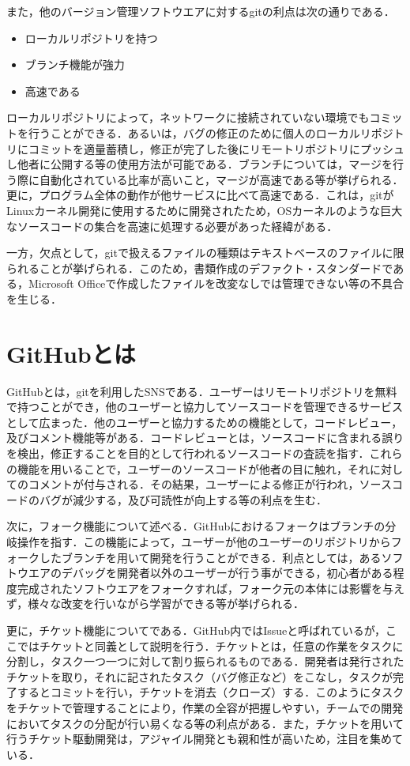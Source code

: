 \documentclass[a4paper,9pt,twocolumn]{jsarticle}
\begin{document}
また，他のバージョン管理ソフトウエアに対するgitの利点は次の通りである．

\begin{itemize}
\item ローカルリポジトリを持つ
\item ブランチ機能が強力
\item 高速である
\end{itemize}

ローカルリポジトリによって，ネットワークに接続されていない環境でもコミットを行うことができる．あるいは，バグの修正のために個人のローカルリポジトリにコミットを適量蓄積し，修正が完了した後にリモートリポジトリにプッシュし他者に公開する等の使用方法が可能である．ブランチについては，マージを行う際に自動化されている比率が高いこと，マージが高速である等が挙げられる．更に，プログラム全体の動作が他サービスに比べて高速である．これは，gitがLinuxカーネル開発に使用するために開発されたため，OSカーネルのような巨大なソースコードの集合を高速に処理する必要があった経緯がある．

一方，欠点として，gitで扱えるファイルの種類はテキストベースのファイルに限られることが挙げられる．このため，書類作成のデファクト・スタンダードである，Microsoft Officeで作成したファイルを改変なしでは管理できない等の不具合を生じる．

\section{GitHubとは}
GitHubとは，gitを利用したSNSである．ユーザーはリモートリポジトリを無料で持つことができ，他のユーザーと協力してソースコードを管理できるサービスとして広まった．他のユーザーと協力するための機能として，コードレビュー，及びコメント機能等がある．コードレビューとは，ソースコードに含まれる誤りを検出，修正することを目的として行われるソースコードの査読を指す．これらの機能を用いることで，ユーザーのソースコードが他者の目に触れ，それに対してのコメントが付与される．その結果，ユーザーによる修正が行われ，ソースコードのバグが減少する，及び可読性が向上する等の利点を生む．

次に，フォーク機能について述べる．GitHubにおけるフォークはブランチの分岐操作を指す．この機能によって，ユーザーが他のユーザーのリポジトリからフォークしたブランチを用いて開発を行うことができる．利点としては，あるソフトウエアのデバッグを開発者以外のユーザーが行う事ができる，初心者がある程度完成されたソフトウエアをフォークすれば，フォーク元の本体には影響を与えず，様々な改変を行いながら学習ができる等が挙げられる．

更に，チケット機能についてである．GitHub内ではIssueと呼ばれているが，ここではチケットと同義として説明を行う．チケットとは，任意の作業をタスクに分割し，タスク一つ一つに対して割り振られるものである．開発者は発行されたチケットを取り，それに記されたタスク（バグ修正など）をこなし，タスクが完了するとコミットを行い，チケットを消去（クローズ）する．このようにタスクをチケットで管理することにより，作業の全容が把握しやすい，チームでの開発においてタスクの分配が行い易くなる等の利点がある．また，チケットを用いて行うチケット駆動開発は，アジャイル開発とも親和性が高いため，注目を集めている．
\end{document}
